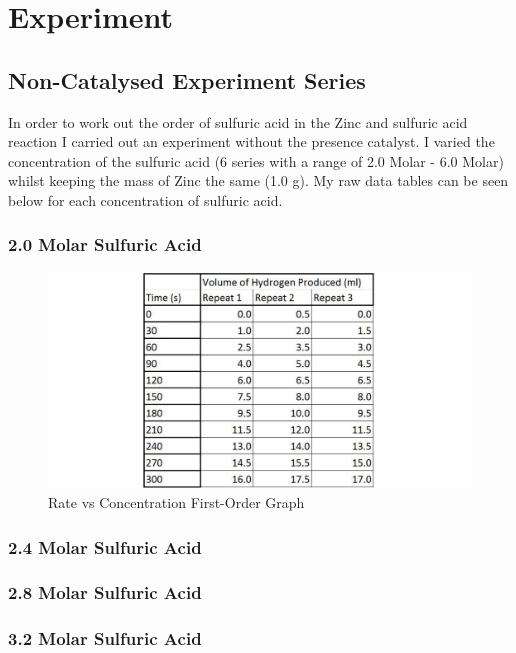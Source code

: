 \chapter {Experiment}

\section{Non-Catalysed Experiment Series}

In order to work out the order of sulfuric acid in the Zinc and sulfuric acid reaction I carried out an experiment without the presence catalyst. I varied the concentration of the sulfuric acid (6 series with a range of 2.0 Molar - 6.0 Molar) whilst keeping the mass of Zinc the same (1.0 g). My raw data tables can be seen below for each concentration of sulfuric acid.

	\subsection{2.0 Molar Sulfuric Acid}

\begin{figure}[H]
    \includegraphics[width=\textwidth]{./Experiment/Images/1NonCatalyst/2Molar.pdf}
    \caption{ Rate vs Concentration First-Order Graph} \label{fig:First Order Graph}
\end{figure}


	\subsection{2.4 Molar Sulfuric Acid}

	\subsection{2.8 Molar Sulfuric Acid}

	\subsection{3.2 Molar Sulfuric Acid}


